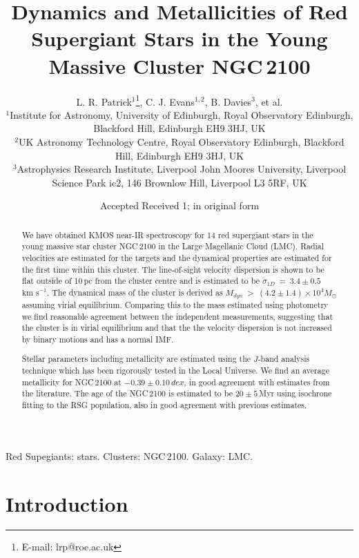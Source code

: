 \documentclass[useAMS,usenatbib]{mn2e}
\title[Dynamics and Metallicities in NGC\,2100]{Dynamics and Metallicities of Red Supergiant Stars in the Young Massive Cluster NGC\,2100}
\author[L. R. Patrick et al.]{L. R. Patrick$^{1}$\thanks{E-mail: lrp@roe.ac.uk}, C. J. Evans$^{1, 2}$, B. Davies$^{3}$, et al.\\
$^{1}$Institute for Astronomy, University of Edinburgh, Royal Observatory Edinburgh, Blackford Hill, Edinburgh EH9 3HJ, UK\\
$^{2}$UK Astronomy Technology Centre, Royal Observatory Edinburgh, Blackford Hill, Edinburgh EH9 3HJ, UK\\
$^{3}$Astrophysics Research Institute, Liverpool John Moores University, Liverpool Science Park ic2, 146 Brownlow Hill, Liverpool L3 5RF, UK
}
\def\kms{$\mbox{km s}^{-1}$}
\begin{document}
\date{Accepted  Received 1; in original form}

\pagerange{\pageref{firstpage}--\pageref{lastpage}} 

\maketitle

\label{firstpage}

\begin{abstract}
We have obtained KMOS near-IR spectroscopy for 14 red supergiant stars in the young massive star cluster NGC\,2100 in the Large Magellanic Cloud (LMC).
Radial velocities are estimated for the targets and the dynamical properties are estimated for the first time within this cluster.
The line-of-sight velocity dispersion is shown to be flat outside of 10\,pc from the cluster centre and is estimated to be
$\sigma_{1D}~=~3.4\pm0.5\,$\kms.
The dynamical mass of the cluster is derived as
$M_{dyn}~>~(4.2\pm1.4)\times10^{4}M_{\odot}$ assuming virial equilibrium.
Comparing this to the mass estimated using photometry we find reasonable agreement between the independent measurements,
suggesting that the cluster is in virial equilibrium and that the the velocity dispersion is not increased by binary motions and has a normal IMF.

Stellar parameters including metallicity are estimated using the $J$-band analysis technique which has been rigorously tested in the Local Universe.
We find an average metallicity for NGC\,2100 at $-0.39\pm0.10\,dex$, in good agreement with estimates from the literature.
The age of the NGC\,2100 is estimated to be $20\pm5\,$Myr using isochrone fitting to the RSG population, also in good agreement with previous estimates.

\end{abstract}

\begin{keywords}
Red Supegiants: stars. Clusters: NGC\,2100. Galaxy: LMC.
\end{keywords}

\section{Introduction} %
\label{sec:introduction}
\end{document}
